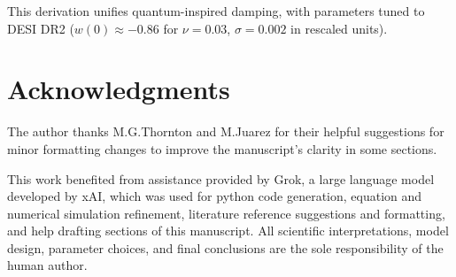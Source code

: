 \documentclass[preprint]{aastex7}
\begin{document}
This derivation unifies quantum-inspired damping, with parameters tuned to DESI DR2 (\( w(0) \approx -0.86 \) for \( \nu=0.03 \), \( \sigma=0.002 \) in rescaled units).

\section{Acknowledgments}
The author thanks M.G.Thornton and M.Juarez for their helpful suggestions for minor formatting changes to improve the manuscript's clarity in some sections.
\vspace{12pt}

This work benefited from assistance provided by Grok, a large language model developed by xAI, which was used for python code generation, equation and numerical simulation refinement, literature reference suggestions and formatting, and help drafting sections of this manuscript. All scientific interpretations, model design, parameter choices, and final conclusions are the sole responsibility of the human author.



\nocite{HuVerdaguer2008}
\nocite{AdlerBassi2007}
\nocite{Thornton2026b}
\end{document}
